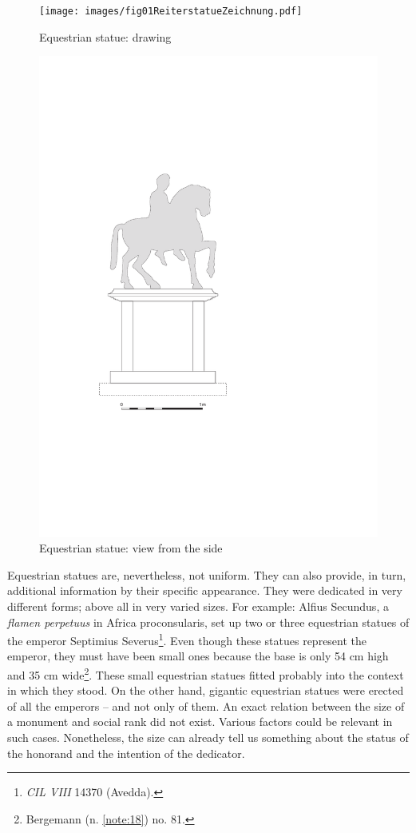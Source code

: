\documentclass[amsthm,ebook]{saparticle}
\begin{document}
\begin{figure}[!bp]
\centering
 \texttt{[image: images/fig01ReiterstatueZeichnung.pdf]}
\caption{Equestrian statue: drawing}
\label{fig:1}
\end{figure}

\begin{figure}[!bp]
\centering
\includegraphics[scale=0.5]{images/fig02ReiterstatueVonDerSeite.pdf}
\caption{Equestrian statue: view from the side}
\label{fig:2}
\end{figure}

Equestrian statues are, nevertheless, not uniform. They can also provide, in turn, 
additional information by their specific appearance. They were dedicated in very 
different forms; above all in very varied sizes. For example: Alfius Secundus, 
a \textit{flamen perpetuus }in Africa proconsularis, set up two or three equestrian 
statues of the emperor Septimius Severus\footnote{\emph{CIL VIII} 14370 (Avedda).}. Even though these statues represent the 
emperor, they must have been small ones because the base is only 54 cm high and 
35 cm wide\footnote{Bergemann (n. \ref{note:18}) no. 81.}. These small equestrian statues fitted probably into the context in which they stood. On the other hand, gigantic equestrian statues were erected of 
all the emperors – and not only of them. An exact relation between the size of 
a monument and social rank did not exist. Various factors could be relevant in 
such cases. Nonetheless, the size can already tell us something about the status 
of the honorand and the intention of the dedicator. 
\end{document}
